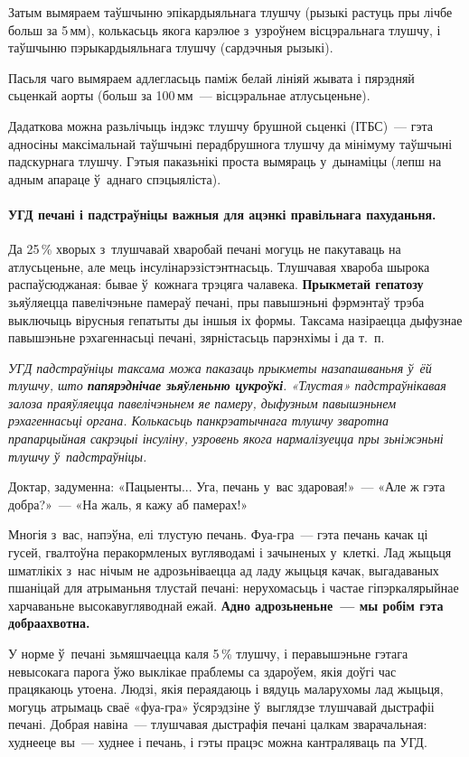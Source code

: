 Затым вымяраем таўшчыню эпікардыяльнага тлушчу (рызыкі растуць пры лічбе больш за 5\,мм), колькасьць якога карэлюе з~узроўнем вісцэральнага тлушчу, і таўшчыню пэрыкардыяльнага тлушчу (сардэчныя рызыкі).

Пасьля чаго вымяраем адлегласьць паміж белай лініяй жывата і пярэдняй сьценкай аорты (больш за 100\,мм~--- вісцэральнае атлусьценьне).

Дадаткова можна разьлічыць індэкс тлушчу брушной сьценкі (ІТБС)~--- гэта адносіны максімальнай таўшчыні перадбрушнога тлушчу да мінімуму таўшчыні падскурнага тлушчу. Гэтыя паказьнікі проста вымяраць у~дынаміцы (лепш на адным апараце ў~аднаго спэцыяліста).

\paragraph{УГД печані і падстраўніцы важныя для ацэнкі правільнага пахуданьня.} Да 25\,\% хворых з~тлушчавай хваробай печані могуць не пакутаваць на атлусьценьне, але мець інсулінарэзістэнтнасьць. Тлушчавая хвароба шырока распаўсюджаная: бывае ў~кожнага трэцяга чалавека. \textbf{Прыкметай гепатозу} зьяўляецца павелічэньне памераў печані, пры павышэньні фэрмэнтаў трэба выключыць вірусныя гепатыты ды іншыя іх формы. Таксама назіраецца дыфузнае павышэньне рэхагеннасьці печані, зярністасьць парэнхімы і да т.~п.

\emph{УГД падстраўніцы таксама можа паказаць прыкметы назапашваньня ў~ёй тлушчу, што \textbf{папярэднічае зьяўленьню цукроўкі}. «Тлустая» падстраўнікавая залоза праяўляецца павелічэньнем яе памеру, дыфузным павышэньнем рэхагеннасьці органа. Колькасьць панкрэатычнага тлушчу зваротна прапарцыйная сакрэцыі інсуліну, узровень якога нармалізуецца пры зьніжэньні тлушчу ў~падстраўніцы.}

Доктар, задуменна: «Пацыенты... Уга, печань у~вас здаровая!»~--- «Але ж гэта добра?»~--- «На жаль, я кажу аб памерах!» 

Многія з~вас, напэўна, елі тлустую печань. Фуа-гра~--- гэта печань качак ці гусей, гвалтоўна перакормленых вугляводамі і зачыненых у~клеткі. Лад жыцьця шматлікіх з~нас нічым не адрозьніваецца ад ладу жыцьця качак, выгадаваных пшаніцай для атрыманьня тлустай печані: нерухомасьць і частае гіпэркалярыйнае харчаваньне высокавугляводнай ежай. \textbf{Адно адрозьненьне~--- мы робім гэта добраахвотна.}

У норме ў~печані зьмяшчаецца каля 5\,\% тлушчу, і перавышэньне гэтага невысокага парога ўжо выклікае праблемы са здароўем, якія доўгі час працякаюць утоена. Людзі, якія пераядаюць і вядуць маларухомы лад жыцьця, могуць атрымаць сваё «фуа-гра» ўсярэдзіне ў~выглядзе тлушчавай дыстрафіі печані. Добрая навіна~--- тлушчавая дыстрафія печані цалкам зварачальная: худнееце вы~--- худнее і печань, і гэты працэс можна кантраляваць па УГД.

